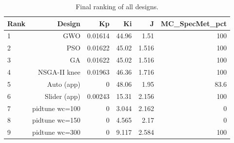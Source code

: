 \begin{table}[t]
\centering\caption{Final ranking of all designs.}\label{tab:rank}
\begin{tabular}{lrrrrr}
\toprule
Rank & Design & Kp & Ki & J & MC\_SpecMet\_pct \\
\midrule
1 & GWO & 0.01614 & 44.96 & 1.51 & 100 \\
2 & PSO & 0.01622 & 45.02 & 1.516 & 100 \\
3 & GA & 0.01622 & 45.02 & 1.516 & 100 \\
4 & NSGA-II knee & 0.01963 & 46.36 & 1.716 & 100 \\
5 & Auto (app) & 0 & 48.06 & 1.95 & 83.6 \\
6 & Slider (app) & 0.00243 & 15.31 & 2.156 & 100 \\
7 & pidtune wc=100 & 0 & 3.044 & 2.162 & 0 \\
8 & pidtune wc=150 & 0 & 4.565 & 2.17 & 0 \\
9 & pidtune wc=300 & 0 & 9.117 & 2.584 & 100 \\
\bottomrule
\end{tabular}
\end{table}
